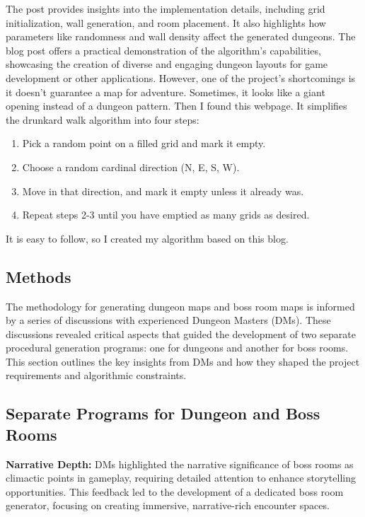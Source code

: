 \documentclass[10pt,twocolumn]{article}
\begin{document}
The post provides insights into the implementation details, including grid initialization, wall generation, and room placement. It also highlights how parameters like randomness and wall density affect the generated dungeons. The blog post offers a practical demonstration of the algorithm's capabilities, showcasing the creation of diverse and engaging dungeon layouts for game development or other applications. However, one of the project's shortcomings is it doesn't guarantee a map for adventure. Sometimes, it looks like a giant opening instead of a dungeon pattern.
Then I found this webpage. It simplifies the drunkard walk algorithm into four steps:
\begin{enumerate}
    \item Pick a random point on a filled grid and mark it empty.
    \item Choose a random cardinal direction (N, E, S, W).
    \item Move in that direction, and mark it empty unless it already was.
    \item Repeat steps 2-3 until you have emptied as many grids as desired.\cite{pcgwiki_drunkardwalk}
\end{enumerate}

It is easy to follow, so I created my algorithm based on this blog.


\subsection{Methods}


The methodology for generating dungeon maps and boss room maps is informed by a series of discussions with experienced Dungeon Masters (DMs). These discussions revealed critical aspects that guided the development of two separate procedural generation programs: one for dungeons and another for boss rooms. This section outlines the key insights from DMs and how they shaped the project requirements and algorithmic constraints.

\subsection{Separate Programs for Dungeon and Boss Rooms}

\textbf{Narrative Depth:} DMs highlighted the narrative significance of boss rooms as climactic points in gameplay, requiring detailed attention to enhance storytelling opportunities. This feedback led to the development of a dedicated boss room generator, focusing on creating immersive, narrative-rich encounter spaces.
\end{document}
